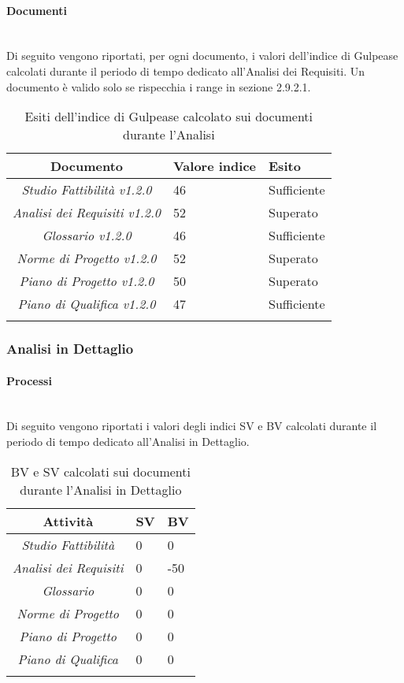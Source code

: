 \paragraph{Documenti} \hfill\\
Di seguito vengono riportati, per ogni documento, i valori dell'indice di Gulpease calcolati durante il periodo di tempo dedicato all'Analisi dei Requisiti. Un documento è valido solo se rispecchia i range in sezione 2.9.2.1.
\begin{longtable}{|c|p{3cm}|p{3cm}|}
\toprule
\textbf{Documento} & \textbf{Valore indice} & \textbf{Esito} \\


\midrule
\emph{Studio Fattibilità v1.2.0} & 46 & Sufficiente\\
\midrule
\emph{Analisi dei Requisiti v1.2.0} & 52 & Superato\\
\midrule
\emph{Glossario v1.2.0} & 46 & Sufficiente\\
\midrule
\emph{Norme di Progetto v1.2.0} & 52 & Superato\\
\midrule
\emph{Piano di Progetto v1.2.0} & 50 & Superato\\
\midrule
\emph{Piano di Qualifica v1.2.0} & 47 & Sufficiente\\
\bottomrule
\caption{Esiti dell'indice di Gulpease calcolato sui documenti durante l'Analisi}
\label{tab:changelog}
\end{longtable}

\subsubsection{Analisi in Dettaglio}
\paragraph{Processi} \hfill\\
Di seguito vengono riportati i valori degli indici SV e BV calcolati durante il periodo di tempo dedicato all'Analisi in Dettaglio.
\begin{longtable}{|c|p{3cm}|p{3cm}|}
\toprule
\textbf{Attività} & \textbf{SV} & \textbf{BV} \\


\midrule
\emph{Studio Fattibilità} & 0 & 0 \\
\midrule
\emph{Analisi dei Requisiti} & 0 & -50\\
\midrule
\emph{Glossario} & 0  & 0\\
\midrule
\emph{Norme di Progetto} & 0 & 0\\
\midrule
\emph{Piano di Progetto} & 0 & 0\\
\midrule
\emph{Piano di Qualifica} & 0 & 0\\
\bottomrule
\caption{BV e SV calcolati sui documenti durante l'Analisi in Dettaglio}
\label{tab:changelog}
\end{longtable}

